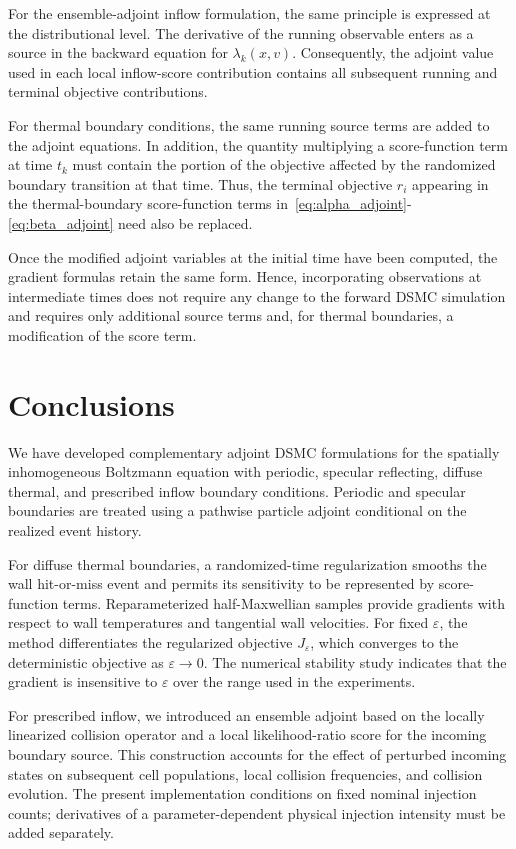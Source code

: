 \documentclass[12pt,nopreprintline]{elsarticle}
\begin{document}
{For the ensemble-adjoint inflow formulation, the same principle is expressed at the distributional level. The derivative of the running observable enters as a source in the backward equation for $\lambda_k(x,v)$. Consequently, the adjoint value used in each local inflow-score contribution contains all subsequent running and terminal objective contributions.

For thermal boundary conditions, the same running source terms are added to the adjoint equations. In addition, the quantity multiplying a score-function term at time $t_k$ must contain the portion of the objective affected by the randomized boundary transition at that time. Thus, the terminal objective $r_i$ appearing in the thermal-boundary score-function terms in~\eqref{eq:alpha_adjoint}-\eqref{eq:beta_adjoint} need also be replaced.

Once the modified adjoint variables at the initial time have been computed, the gradient formulas retain the same form.  Hence, incorporating observations at intermediate times does not require any change to the forward DSMC simulation and requires only additional source terms and, for thermal boundaries, a modification of the score term.
}

\section{Conclusions}\label{sec:conclusion}

We have developed complementary adjoint DSMC formulations for the spatially inhomogeneous Boltzmann equation with periodic, specular reflecting, diffuse thermal, and prescribed inflow boundary conditions. Periodic and specular boundaries are treated using a pathwise particle adjoint conditional on the realized event history.

For diffuse thermal boundaries, a randomized-time regularization smooths the wall hit-or-miss event and permits its sensitivity to be represented by score-function terms. Reparameterized half-Maxwellian samples provide gradients with respect to wall temperatures and tangential wall velocities. For fixed $\varepsilon$, the method differentiates the regularized objective $J_\varepsilon$, which converges to the deterministic objective as $\varepsilon\to0$. The numerical stability study indicates that the gradient is insensitive to $\varepsilon$ over the range used in the experiments.

For prescribed inflow, we introduced an ensemble adjoint based on the locally linearized collision operator and a local likelihood-ratio score for the incoming boundary source. This construction accounts for the effect of perturbed incoming states on subsequent cell populations, local collision frequencies, and collision evolution. The present implementation conditions on fixed nominal injection counts; derivatives of a parameter-dependent physical injection intensity must be added separately.
\end{document}
